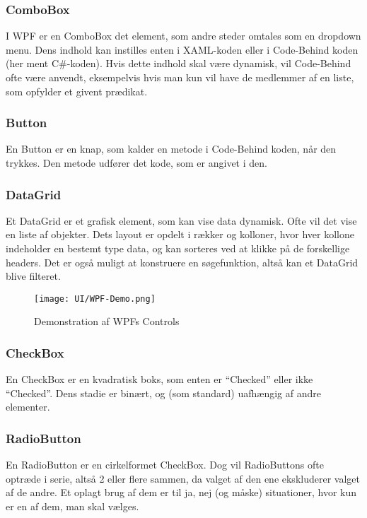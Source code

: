 \subsubsection*{ComboBox}
I WPF er en ComboBox det element, som andre steder omtales som en dropdown menu. 
Dens indhold kan instilles enten i XAML-koden eller i Code-Behind koden (her ment C\#-koden).
Hvis dette indhold skal være dynamisk, vil Code-Behind ofte være anvendt, eksempelvis hvis man kun vil have de medlemmer af en liste, som opfylder et givent prædikat. 

\subsubsection*{Button}
En Button er en knap, som kalder en metode i Code-Behind koden, når den trykkes. 
Den metode udfører det kode, som er angivet i den.

\subsubsection*{DataGrid}
Et DataGrid er et grafisk element, som kan vise data dynamisk.
Ofte vil det vise en liste af objekter.
Dets layout er opdelt i rækker og kolloner, hvor hver kollone indeholder en bestemt type data, og kan sorteres ved at klikke på de forskellige headers.
Det er også muligt at konstruere en søgefunktion, altså kan et DataGrid blive filteret.

\begin{wrapfigure}[22]{R}{0.5\textwidth}
    \label{img:wpfdemo}
    \vspace{-30pt}
    \begin{center}
        \texttt{[image: UI/WPF-Demo.png]}
    \end{center}
    \vspace{-15pt}
    \caption{Demonstration af WPFs Controls}
    \vspace{-15pt}
\end{wrapfigure}

\subsubsection*{CheckBox}
En CheckBox er en kvadratisk boks, som enten er ``Checked'' eller ikke ``Checked''. 
Dens stadie er binært, og (som standard) uafhængig af andre elementer.

\subsubsection*{RadioButton}
En RadioButton er en cirkelformet CheckBox.
Dog vil RadioButtons ofte optræde i serie, altså 2 eller flere sammen, da valget af den ene ekskluderer valget af de andre. 
Et oplagt brug af dem er til ja, nej (og måske) situationer, hvor kun er en af dem, man skal vælges.

